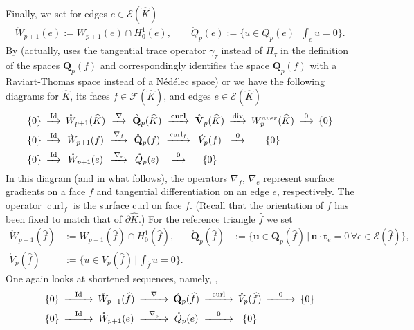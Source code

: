 \documentclass{article}
\begin{document}
Finally, we set for edges $e\in{\mathcal{E}%
}(\widehat{K})$
\begin{align*}
\mathring{W}_{p+1}(e):=W_{p+1}(e)\cap H_{0}^{1}(e),
\qquad\mathring{Q}_{p}(e):=\{u \in Q_{p}(e)\,|\, \int_e u = 0\}. 
\end{align*}
By
\cite[eq.~(4.16)]{hiptmair08} (actually, \cite{hiptmair08} uses the tangential trace
operator $\gamma_{\tau}$ instead of $\Pi_{\tau}$ in the definition of the
spaces ${\mathbf{Q}}_{p}(f)$ and correspondingly identifies the space
${\mathbf{Q}}_{p}(f)$ with a Raviart-Thomas space instead of a N\'{e}d\'{e}lec
space) or \cite{demkowicz-buffa05} we have the following diagrams for $\widehat K$, 
its faces $f\in{\mathcal{F}}(\widehat{K})$, and edges $e\in{\mathcal{E}}(\widehat{K})$
\begin{equation}
\minCDarrowwidth15pt
\begin{CD} \{0\} @>\operatorname{Id} >> \mathring{W}_{p+1}(\widehat K) @> \nabla >> \mathring{\mathbf{Q}}_p(\widehat K) @> \operatorname*{\mathbf{curl}} >> \mathring{\mathbf{V}}_p(\widehat K) @> \operatorname*{div} >> W^{aver}_p(\widehat K)  @> 0 >> \{0\} \\ \{0\} @>\operatorname{Id} >> \mathring{W}_{p+1}(f) @> \nabla_f >> \mathring{\mathbf{Q}}_p(f) @> \operatorname*{curl}_f >> \mathring{V}_p(f)  @> 0 >> \{0\} \\ \{0\} @> \operatorname{Id}>> \mathring{W}_{p+1}(e) @> \nabla_e >> \mathring{Q}_p(e) @> 0 >> \{0\} \end{CD} \label{eq:commuting-diagram-bc}%
\end{equation}
In this diagram (and in what follows), the operators $\nabla_{f}$, $\nabla
_{e}$ represent surface gradients on a face $f$ and tangential differentiation
on an edge $e$, respectively. The operator $\operatorname*{curl}_{f}$ is the
surface curl on face $f$. (Recall that the orientation of $f$ has been fixed to match that of 
$\partial \widehat K$.)
%
For the reference triangle $\widehat f$ we set
\begin{align*}
\mathring{W}_{p+1}(\widehat{f}) &:= W_{p+1}(\widehat{f}) \cap H_0^1(\widehat{f}), &\mathring{\mathbf{Q}}_p(\widehat f) &:= \{\mathbf{u} \in \mathbf{Q}_p(\widehat f) \, | \, \mathbf{u} \cdot \mathbf{t}_e = 0 \, \forall e\in\mathcal{E}(\widehat{f})\}, \\
\mathring{V}_{p}(\widehat{f}) &:=\{u \in V_{p}(\widehat{f})\,|\, \int_{\widehat{f}} u = 0\}.
\end{align*}
One again looks at shortened sequences, namely, \cite[(33)]{demkowicz08}, 
\begin{equation}
\begin{CD} \{0\} @>\operatorname{Id} >> \mathring{W}_{p+1}(\widehat f) @> \nabla >> \mathring{\mathbf{Q}}_p(\widehat f) @> \operatorname*{{curl}} >> \mathring{V}_p(\widehat f) @> 0 >> \{0\} \\ \{0\} @>\operatorname{Id} >> \mathring{W}_{p+1}(e) @> \nabla_e >> \mathring{Q}_p(e) @> 0 >> \{0\} \end{CD} \label{eq:commuting-diagram-bc-2d}%
\end{equation}
\end{document}
